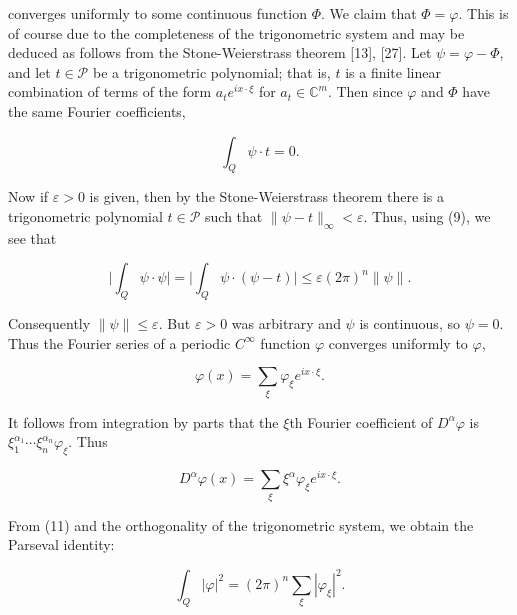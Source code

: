 converges uniformly to some continuous function $\Phi$. We claim that $\Phi = \varphi$. This is of course due to the completeness of the trigonometric system and may be deduced as follows from the Stone-Weierstrass theorem [13], [27]. Let $\psi = \varphi - \Phi$, and let $t \in \mathcal{P}$ be a trigonometric polynomial; that is, $t$ is a finite linear combination of terms of the form $a_t e^{i x \cdot \xi}$ for $a_t \in \mathbb{C}^m$. Then since $\varphi$ and $\Phi$ have the same Fourier coefficients,

\begin{equation}
\tag{9}\label{eq:6.16:9}
\int_{Q}\psi\cdot t=0.
\end{equation}

Now if $\varepsilon > 0$ is given, then by the Stone-Weierstrass theorem there is a trigonometric polynomial $t \in \mathcal{P}$ such that $\|\psi - t\|_\infty < \varepsilon$. Thus, using (9), we see that

\begin{equation}
\tag{10}\label{eq:6.16:10}
\bigg|\int_{Q}\psi\cdot\psi\bigg|=\bigg|\int_{Q}\psi\cdot(\psi-t)\bigg|\leq\varepsilon(2\pi)^{n}\|\psi\|.
\end{equation}

Consequently  $ \|\psi\| \leq \varepsilon $. But  $ \varepsilon > 0 $ was arbitrary and  $ \psi $ is continuous, so  $ \psi = 0 $. Thus the Fourier series of a periodic  $ C^\infty $ function  $ \varphi $ converges uniformly to  $ \varphi $,

\begin{equation}
\tag{11}\label{eq:6.16:11}
\varphi(x)=\sum_{\xi}\varphi_{\xi}e^{i x\cdot\xi}.
\end{equation}

It follows from integration by parts that the $\xi$th Fourier coefficient of $D^{\alpha}\varphi$ is $\xi_{1}^{\alpha_{1}}\cdots\xi_{n}^{\alpha_{n}}\varphi_{\xi}$. Thus

\begin{equation}
\tag{12}\label{eq:6.16:12}
D^{\alpha}\varphi(x)=\sum_{\xi}\xi^{\alpha}\varphi_{\xi}e^{ix\cdot\xi}.
\end{equation}

From (11) and the orthogonality of the trigonometric system, we obtain the Parseval identity:

\begin{equation}
\tag{13}\label{eq:6.16:13}
\int_{Q}|\varphi|^{2}=(2\pi)^{n}\sum_{\xi}|\varphi_{\xi}|^{2}.
\end{equation}

